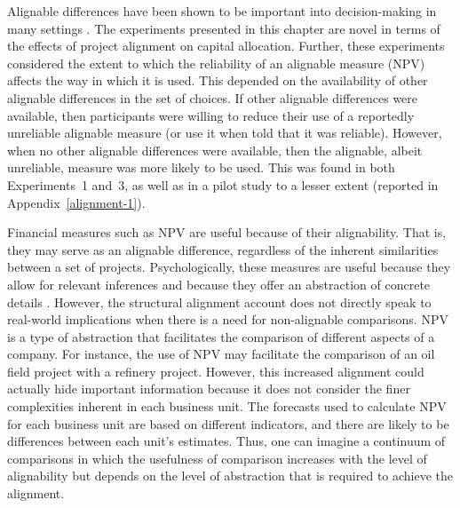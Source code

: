 \documentclass[a4paper, nobind]{templates/ociamthesis}
\theoremstyle{definition}
\theoremstyle{definition}
\theoremstyle{definition}
\theoremstyle{definition}
\theoremstyle{remark}
\begin{document}
Alignable differences have been shown to be important into decision-making in
many settings \autocite{markman2010,markman1995}. The experiments presented in this
chapter are novel in terms of the effects of project alignment on capital
allocation. Further, these experiments considered the extent to which the
reliability of an alignable measure (NPV) affects the way in which it is used.
This depended on the availability of other alignable differences in the set of
choices. If other alignable differences were available, then participants were
willing to reduce their use of a reportedly unreliable alignable measure (or use
it when told that it was reliable). However, when no other alignable differences
were available, then the alignable, albeit unreliable, measure was more likely
to be used. This was found in both Experiments~1 and~3, as well as in a pilot
study to a lesser extent (reported in Appendix~\ref{alignment-1}).

Financial measures such as NPV are useful because of their alignability. That
is, they may serve as an alignable difference, regardless of the inherent
similarities between a set of projects. Psychologically, these measures are
useful because they allow for relevant inferences \autocite{lassaline1996} and because
they offer an abstraction of concrete details \autocite{doumas2013}. However, the
structural alignment account does not directly speak to real-world implications
when there is a need for non-alignable comparisons. NPV is a type of abstraction
that facilitates the comparison of different aspects of a company. For instance,
the use of NPV may facilitate the comparison of an oil field project with a
refinery project. However, this increased alignment could actually hide
important information because it does not consider the finer complexities
inherent in each business unit. The forecasts used to calculate NPV for each
business unit are based on different indicators, and there are likely to be
differences between each unit's estimates. Thus, one can imagine a continuum of
comparisons in which the usefulness of comparison increases with the level of
alignability but depends on the level of abstraction that is required to achieve
the alignment.
\end{document}

